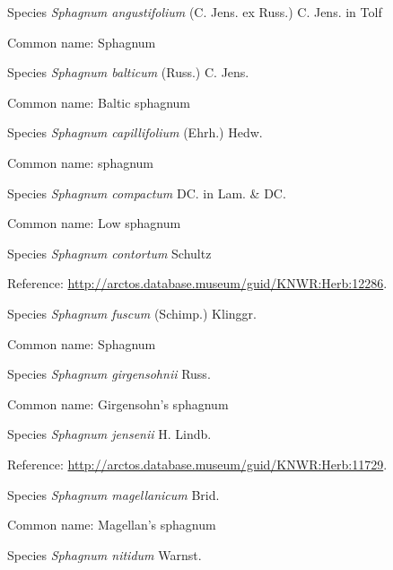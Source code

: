 \documentclass[9pt, article]{memoir}
\begin{document}
\begin{multicols}{2}
\vspace{6pt}\noindent\hspace{36pt}Species \textit{Sphagnum angustifolium} (C. Jens. ex Russ.) C. Jens. in Tolf


Common name: Sphagnum

\vspace{6pt}\noindent\hspace{36pt}Species \textit{Sphagnum balticum} (Russ.) C. Jens.


Common name: Baltic sphagnum

\vspace{6pt}\noindent\hspace{36pt}Species \textit{Sphagnum capillifolium} (Ehrh.) Hedw.


Common name: sphagnum

\vspace{6pt}\noindent\hspace{36pt}Species \textit{Sphagnum compactum} DC. in Lam. \& DC.


Common name: Low sphagnum

\vspace{6pt}\noindent\hspace{36pt}Species \textit{Sphagnum contortum} Schultz


Reference: 
\url{http://arctos.database.museum/guid/KNWR:Herb:12286}.

\vspace{6pt}\noindent\hspace{36pt}Species \textit{Sphagnum fuscum} (Schimp.) Klinggr.


Common name: Sphagnum

\vspace{6pt}\noindent\hspace{36pt}Species \textit{Sphagnum girgensohnii} Russ.


Common name: Girgensohn's sphagnum

\vspace{6pt}\noindent\hspace{36pt}Species \textit{Sphagnum jensenii} H. Lindb.


Reference: 
\url{http://arctos.database.museum/guid/KNWR:Herb:11729}.

\vspace{6pt}\noindent\hspace{36pt}Species \textit{Sphagnum magellanicum} Brid.


Common name: Magellan's sphagnum

\vspace{6pt}\noindent\hspace{36pt}Species \textit{Sphagnum nitidum} Warnst.



\end{multicols}
\end{document}
